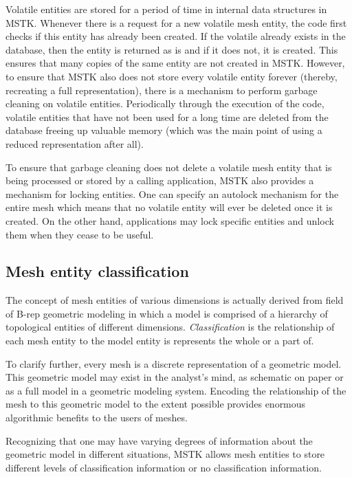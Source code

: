 \documentclass[12pt]{article}
\begin{document}
Volatile entities are stored for a period of time in internal data
structures in MSTK. Whenever there is a request for a new volatile
mesh entity, the code first checks if this entity has already been
created. If the volatile already exists in the database, then the
entity is returned as is and if it does not, it is created. This
ensures that many copies of the same entity are not created in
MSTK. However, to ensure that MSTK also does not store every volatile
entity forever (thereby, recreating a full representation), there is a
mechanism to perform garbage cleaning on volatile
entities. Periodically through the execution of the code, volatile
entities that have not been used for a long time are deleted from the
database freeing up valuable memory (which was the main point of using
a reduced representation after all).

To ensure that garbage cleaning does not delete a volatile mesh entity
that is being processed or stored by a calling application, MSTK also
provides a mechanism for locking entities. One can specify an autolock
mechanism for the entire mesh which means that no volatile entity will
ever be deleted once it is created. On the other hand, applications
may lock specific entities and unlock them when they cease to be
useful. 

\subsection{Mesh entity classification}

The concept of mesh entities of various dimensions is actually derived
from field of B-rep geometric modeling in which a model is comprised
of a hierarchy of topological entities of different dimensions. {\em
  Classification} is the relationship of each mesh entity to the model
entity is represents the whole or a part of.

To clarify further, every mesh is a discrete representation of a
geometric model. This geometric model may exist in the analyst's mind,
as schematic on paper or as a full model in a geometric modeling
system. Encoding the relationship of the mesh to this geometric model
to the extent possible provides enormous algorithmic benefits to the
users of meshes.

Recognizing that one may have varying degrees of information about the
geometric model in different situations, MSTK allows mesh entities to
store different levels of classification information or no
classification information.
\end{document}
